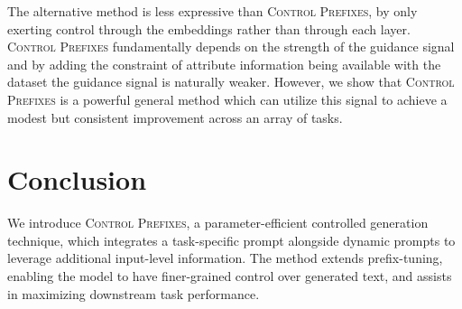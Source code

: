 \documentclass[11pt]{article}
\newcommand{\control}{\textsc{Control Prefixes}\xspace}
\begin{document}
The alternative method is less expressive than \control, by only exerting control through the embeddings rather than through each layer. \control fundamentally depends on the strength of the guidance signal and by adding the constraint of attribute information being available with the dataset the guidance signal is naturally weaker. However, we show that \control is a powerful general method which can utilize this signal to achieve a modest but consistent improvement across an array of tasks.


\begin{table}[t]
\centering
{}
\caption{A comparison of the performance on the \emph{Unseen} portions for WebNLG test sets, with i) a single OOV Control Prefix used for all samples from unseen categories, or ii) the zero-shot transfer approach outlined, utilizing the available textual labels.}
\label{tab:zero}
\end{table}



\section{Conclusion} 



We introduce \control, a parameter-efficient controlled generation technique, which integrates a task-specific prompt alongside dynamic prompts to leverage additional input-level information. The method extends prefix-tuning, enabling the model to have finer-grained control over generated text, and assists in maximizing downstream task performance. 
\end{document}
